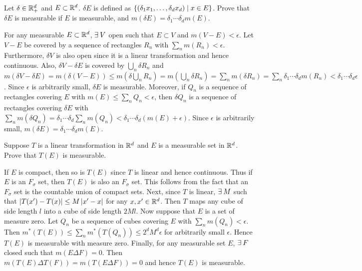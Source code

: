 \begin{exercise}
    Let $\delta\in\mathbb{R}^d_+$ and $E\subset\mathbb{R}^d$. $\delta E$ is 
    defined as $\left\{ (\delta_1x_1,\ldots,\delta_dx_d) \;\middle\vert\; x\in E \right\}$. 
    Prove that $\delta E$ is measurable if $E$ is measurable, 
    and $m(\delta E) = \delta_1\cdots\delta_dm(E)$.
\end{exercise}
\begin{pf}
    For any measurable $E\subset\mathbb{R}^d$, $\exists\: V$ open such
    that $E\subset V$ and $m(V-E)<\epsilon$. Let $V-E$ be 
    covered by a sequence of rectangles $R_n$ with 
    $\sum_n m(R_n) < \epsilon$. Furthermore, $\delta V$ is 
    also open since it is a linear transformation and hence 
    continuous. Also, $\delta V-\delta E$ is covered by 
    $\bigcup_n \delta R_n$ and $m(\delta V- \delta E)
    = m(\delta (V-E)) \leq m(\delta \bigcup_n R_n) 
    = m(\bigcup_n\delta R_n) = \sum_n m(\delta R_n) 
    = \sum_n \delta_1\cdots\delta_d m(R_n) 
    < \delta_1\cdots\delta_d\epsilon$. Since $\epsilon$ is
    arbitrarily small, $\delta E$ is measurable. Moreover, 
    if $Q_n$ is a sequence of rectangles covering $E$ with 
    $m(E)\leq\sum_n Q_n < \epsilon$, then
    $\delta Q_n$ is a sequence of rectangles covering 
    $\delta E$ with $\sum_n m(\delta Q_n) 
    = \delta_1\cdots\delta_d\sum_n m(Q_n) 
    < \delta_1\cdots\delta_d(m(E) + \epsilon)$. Since 
    $\epsilon$ is arbitrarily small, $m(\delta E) 
    = \delta_1\cdots\delta_d m(E)$. 
\end{pf}

\begin{exercise}
    Suppose $T$ is a linear transformation in $\mathbb{R}^d$ and $E$
    is a measurable set in $\mathbb{R}^d$. Prove that $T(E)$ is 
    measurable.
\end{exercise}
\begin{pf}
    If $E$ is compact, then so is $T(E)$ since $T$ is linear 
    and hence continuous. Thus if $E$ is an $F_\sigma$ set, 
    then $T(E)$ is also an $F_\sigma$ set. This follows from 
    the fact that an $F_\sigma$ set is the countable union of
    compact sets. Next, since $T$ is linear, $\exists\: M$ 
    such that $\left\lvert {T(x')-T(x)} \right\rvert\leq M\left\lvert {x'-x} \right\rvert$ for any 
    $x,x'\in\mathbb{R}^d$. Then $T$ maps any cube of side length $l$
    into a cube of side length $2Ml$. Now suppose that $E$ is 
    a set of measure zero. Let $Q_n$ be a sequence of cubes 
    covering $E$ with $\sum_n m(Q_n)<\epsilon$. Then 
    $m^*(T(E))\leq\sum_n m^*(T(Q_n))\leq 2^dM^d\epsilon$ for 
    arbitrarily small $\epsilon$. Hence $T(E)$ is measurable 
    with measure zero. Finally, for any measurable set $E$,
    $\exists\: F$ closed such that $m(E\Delta F) = 0$. Then 
    $m(T(E)\Delta T(F)) = m(T(E\Delta F)) = 0$ and hence 
    $T(E)$ is measurable.
\end{pf}

